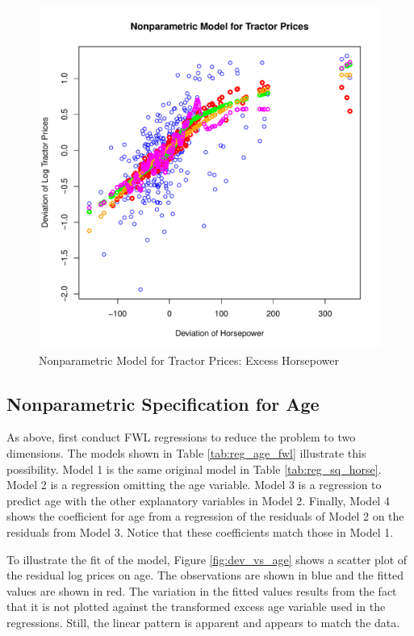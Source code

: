 \documentclass[11pt]{paper}
\begin{document}
\begin{figure}[h!]
  \centering
  \includegraphics[scale = 0.5, keepaspectratio=true]{../Figures/dev_np_vs_horse_dev_bw}
  \caption{Nonparametric Model for Tractor Prices: Excess Horsepower} \label{fig:dev_np_vs_horse_dev_bw}
\end{figure}





\clearpage
\subsection{Nonparametric Specification for Age}

As above, first conduct FWL regressions 
to reduce the problem to two dimensions. 
The models shown in
Table \ref{tab:reg_age_fwl}
illustrate this possibility. 
Model 1 is the same original model in 
Table \ref{tab:reg_sq_horse}. 
Model 2 is a regression omitting the age variable. 
Model 3 is a regression to predict age with the other explanatory variables in Model 2.
Finally, Model 4 shows the coefficient for age
from a regression of the residuals of Model 2
on the residuals from Model 3. 
Notice that these coefficients match those in Model 1. 



\pagebreak 
To illustrate the fit of the model, 
Figure \ref{fig:dev_vs_age} shows a scatter plot 
of the residual log prices on age. 
The observations are shown in blue
and the fitted values are shown in red.
The variation in the fitted values results from the 
fact that it is not plotted against the transformed excess age variable used in the regressions.
Still, the linear pattern is apparent
and appears to match the data. 
\end{document}
